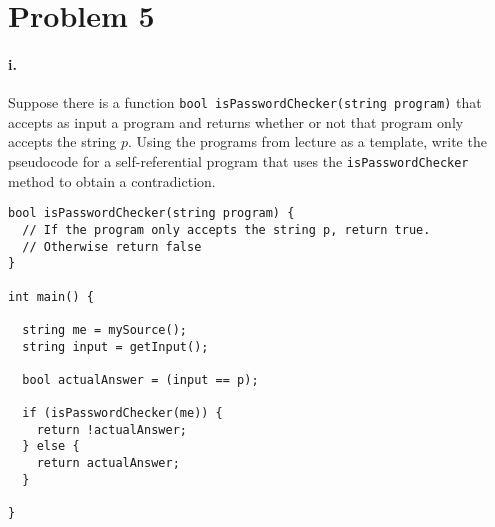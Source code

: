 \documentclass[10pt,letter]{article}
\begin{document}
\section*{Problem 5}

\paragraph{i.} Suppose there is a function \texttt{bool isPasswordChecker(string program)} that accepts as input a program and returns whether or not that program only accepts the string $p$. Using the programs from lecture as a template, write the pseudocode for a self-referential program that uses the \texttt{isPasswordChecker} method to obtain a contradiction. 

\begin{lstlisting}
bool isPasswordChecker(string program) {
  // If the program only accepts the string p, return true.
  // Otherwise return false
}

int main() {

  string me = mySource();
  string input = getInput();

  bool actualAnswer = (input == p);

  if (isPasswordChecker(me)) {
    return !actualAnswer;
  } else {
    return actualAnswer;
  }

}
\end{lstlisting}
\end{document}
